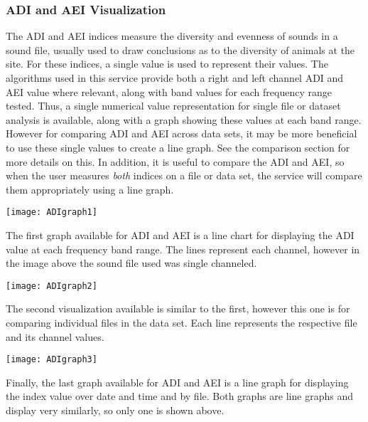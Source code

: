 \subsubsection{ADI and AEI Visualization}
The ADI and AEI indices measure the diversity and evenness of sounds in a sound file, usually used to draw conclusions as to the diversity of animals at the site. For these indices, a single value is used to represent their values. The algorithms used in this service provide both a right and left channel ADI and AEI value where relevant, along with band values for each frequency range tested. Thus, a single numerical value representation for single file or dataset analysis is available, along with a graph showing these values at each band range. However for comparing ADI and AEI across data sets, it may be more beneficial to use these single values to create a line graph. See the comparison section for more details on this. In addition, it is useful to compare the ADI and AEI, so when the user measures \textit{both} indices on a file or data set, the service will compare them appropriately using a line graph.\\

\begin{center}
	\texttt{[image: ADIgraph1]} \\[12pt]
\end{center}
The first graph available for ADI and AEI is a line chart for displaying the ADI value at each frequency band range. The lines represent each channel, however in the image above the sound file used was single channeled.\\

\begin{center}
	\texttt{[image: ADIgraph2]} \\[12pt]
\end{center}
The second visualization available is similar to the first, however this one is for comparing individual files in the data set. Each line represents the respective file and its channel values.\\

\begin{center}
	\texttt{[image: ADIgraph3]} \\[12pt]
\end{center}
Finally, the last graph available for ADI and AEI is a line graph for displaying the index value over date and time and by file. Both graphs are line graphs and display very similarly, so only one is shown above.
